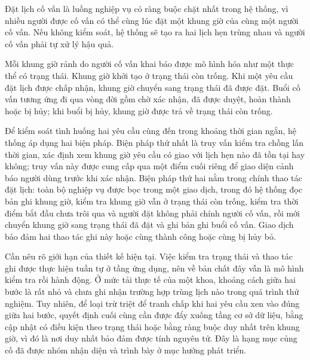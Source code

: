 \documentclass[12pt,a4paper,oneside]{report}
\begin{document}
Đặt lịch cố vấn là luồng nghiệp vụ có ràng buộc chặt nhất trong hệ thống, vì nhiều người được cố vấn có thể cùng lúc đặt một khung giờ của cùng một người cố vấn. Nếu không kiểm soát, hệ thống sẽ tạo ra hai lịch hẹn trùng nhau và người cố vấn phải tự xử lý hậu quả.

Mỗi khung giờ rảnh do người cố vấn khai báo được mô hình hóa như một thực thể có trạng thái. Khung giờ khởi tạo ở trạng thái còn trống. Khi một yêu cầu đặt lịch được chấp nhận, khung giờ chuyển sang trạng thái đã được đặt. Buổi cố vấn tương ứng đi qua vòng đời gồm chờ xác nhận, đã được duyệt, hoàn thành hoặc bị hủy; khi buổi bị hủy, khung giờ được trả về trạng thái còn trống.

Để kiểm soát tình huống hai yêu cầu cùng đến trong khoảng thời gian ngắn, hệ thống áp dụng hai biện pháp. Biện pháp thứ nhất là truy vấn kiểm tra chồng lấn thời gian, xác định xem khung giờ yêu cầu có giao với lịch hẹn nào đã tồn tại hay không; truy vấn này được cung cấp qua một điểm cuối riêng để giao diện cảnh báo người dùng trước khi xác nhận. Biện pháp thứ hai nằm trong chính thao tác đặt lịch: toàn bộ nghiệp vụ được bọc trong một giao dịch, trong đó hệ thống đọc bản ghi khung giờ, kiểm tra khung giờ vẫn ở trạng thái còn trống, kiểm tra thời điểm bắt đầu chưa trôi qua và người đặt không phải chính người cố vấn, rồi mới chuyển khung giờ sang trạng thái đã đặt và ghi bản ghi buổi cố vấn. Giao dịch bảo đảm hai thao tác ghi này hoặc cùng thành công hoặc cùng bị hủy bỏ.

Cần nêu rõ giới hạn của thiết kế hiện tại. Việc kiểm tra trạng thái và thao tác ghi được thực hiện tuần tự ở tầng ứng dụng, nên về bản chất đây vẫn là mô hình kiểm tra rồi hành động. Ở mức tải thực tế của một khoa, khoảng cách giữa hai bước là rất nhỏ và chưa ghi nhận trường hợp trùng lịch nào trong quá trình thử nghiệm. Tuy nhiên, để loại trừ triệt để tranh chấp khi hai yêu cầu xen vào đúng giữa hai bước, quyết định cuối cùng cần được đẩy xuống tầng cơ sở dữ liệu, bằng cập nhật có điều kiện theo trạng thái hoặc bằng ràng buộc duy nhất trên khung giờ, vì đó là nơi duy nhất bảo đảm được tính nguyên tử. Đây là hạng mục củng cố đã được nhóm nhận diện và trình bày ở mục hướng phát triển.
\end{document}
